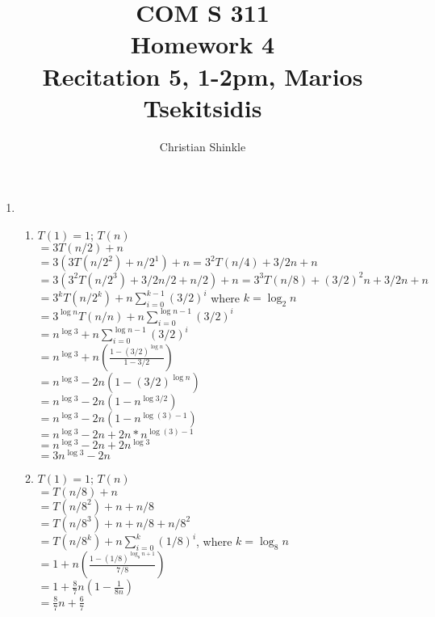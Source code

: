 \documentclass{article}
\begin{document}
 	\title{COM S 311\large \\Homework 4\\Recitation 5, 1-2pm, Marios Tsekitsidis}
	\author{Christian Shinkle}
	\maketitle
	\begin{enumerate}
		\item 
		\begin{enumerate}
			\item $T(1)=1$; $T(n)$\\
			$=3T(n/2)+n$\\
			$=3(3T(n/2^2)+n/2^1)+n=3^2T(n/4)+3/2n+n$\\
			$=3(3^2T(n/2^3)+3/2n/2+n/2)+n=3^3T(n/8)+(3/2)^2n+3/2n+n$\\
			$=3^kT(n/2^k)+n\sum^{k-1}_{i=0}(3/2)^i$ where $k=\log_2 n$\\
			$=3^{\log n}T(n/n)+n\sum^{\log n-1}_{i=0}(3/2)^i$\\
			$=n^{\log 3}+n\sum^{\log n-1}_{i=0}(3/2)^i$\\
			$=n^{\log 3}+n(\frac {1-(3/2)^{\log n}}{1-3/2})$\\
			$=n^{\log 3}-2n(1-(3/2)^{\log n})$\\
			$=n^{\log 3}-2n(1-n^{\log 3/2})$\\
			$=n^{\log 3}-2n(1-n^{\log (3) -1 })$\\
			$=n^{\log 3}-2n+2n*n^{\log (3) -1 }$\\
			$=n^{\log 3}-2n+2n^{\log 3}$\\
			$=3n^{\log 3}-2n$\\
			
			\item $T(1)=1$; $T(n)$\\
			$=T(n/8)+n$\\
			$=T(n/8^2)+n+n/8$\\
			$=T(n/8^3)+n+n/8+n/8^2$\\
			$=T(n/8^k)+n\sum_{i=0}^{k}(1/8)^i$, where $k=\log_8 n$\\
			$=1+n(\frac{1-(1/8)^{\log_8 n+1}} {7/8})$\\
			$=1+\frac 8 7 n(1-\frac 1{8n})$\\
			$=\frac 8 7 n+\frac 6 7$\\
			

\end{enumerate}
\end{enumerate}
\end{document}
